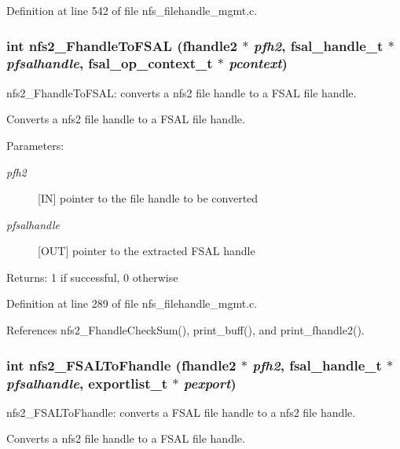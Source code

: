 Definition at line 542 of file nfs\_\-filehandle\_\-mgmt.c.
\subsubsection{\setlength{\rightskip}{0pt plus 5cm}int nfs2\_\-Fhandle\-To\-FSAL (fhandle2 $\ast$ {\em pfh2}, fsal\_\-handle\_\-t $\ast$ {\em pfsalhandle}, fsal\_\-op\_\-context\_\-t $\ast$ {\em pcontext})}\label{nfs__filehandle__mgmt_8c_a4}


nfs2\_\-Fhandle\-To\-FSAL: converts a nfs2 file handle to a FSAL file handle.

Converts a nfs2 file handle to a FSAL file handle.

\begin{Desc}
\item[Parameters:]
\begin{description}
\item[{\em pfh2}][IN] pointer to the file handle to be converted \item[{\em pfsalhandle}][OUT] pointer to the extracted FSAL handle\end{description}
\end{Desc}
\begin{Desc}
\item[Returns:]1 if successful, 0 otherwise \end{Desc}


Definition at line 289 of file nfs\_\-filehandle\_\-mgmt.c.

References nfs2\_\-Fhandle\-Check\-Sum(), print\_\-buff(), and print\_\-fhandle2().
\subsubsection{\setlength{\rightskip}{0pt plus 5cm}int nfs2\_\-FSALTo\-Fhandle (fhandle2 $\ast$ {\em pfh2}, fsal\_\-handle\_\-t $\ast$ {\em pfsalhandle}, exportlist\_\-t $\ast$ {\em pexport})}\label{nfs__filehandle__mgmt_8c_a7}


nfs2\_\-FSALTo\-Fhandle: converts a FSAL file handle to a nfs2 file handle.

Converts a nfs2 file handle to a FSAL file handle.

